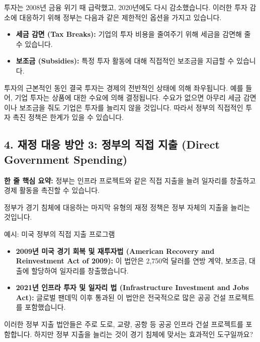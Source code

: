 \documentclass[11pt,a4paper]{article}
\theoremstyle{definition}
\begin{document}
투자는 2008년 금융 위기 때 급락했고, 2020년에도 다시 감소했습니다. 이러한 투자 감소에 대응하기 위해 정부는 다음과 같은 제한적인 옵션을 가지고 있습니다.

\begin{itemize}
    \item \textbf{세금 감면 (Tax Breaks):} 기업의 투자 비용을 줄여주기 위해 세금을 감면해 줄 수 있습니다.
    \item \textbf{보조금 (Subsidies):} 특정 투자 활동에 대해 직접적인 보조금을 지급할 수 있습니다.
\end{itemize}

\begin{cautionbox}{투자의 근본적인 동인}
    결국 투자는 경제의 전반적인 상태에 의해 좌우됩니다. 예를 들어, 기업 투자는 상품에 대한 수요에 의해 결정됩니다. 수요가 없으면 아무리 세금 감면이나 보조금을 줘도 기업은 투자를 늘리지 않을 것입니다. 따라서 정부의 직접적인 투자 촉진 정책은 한계가 있을 수 있습니다.
\end{cautionbox}

\subsection{4. 재정 대응 방안 3: 정부의 직접 지출 (Direct Government Spending)}

\begin{tcolorbox}[mybox={정부 지출의 역할}]
    \textbf{한 줄 핵심 요약:} 정부는 인프라 프로젝트와 같은 직접 지출을 늘려 일자리를 창출하고 경제 활동을 촉진할 수 있습니다.
\end{tcolorbox}

정부가 경기 침체에 대응하는 마지막 유형의 재정 정책은 정부 자체의 지출을 늘리는 것입니다.

\begin{examplebox}{예시: 미국 정부의 직접 지출 프로그램}
    \begin{itemize}
        \item \textbf{2009년 미국 경기 회복 및 재투자법 (American Recovery and Reinvestment Act of 2009):} 이 법안은 2,750억 달러를 연방 계약, 보조금, 대출에 할당하여 일자리를 창출했습니다.
        \item \textbf{2021년 인프라 투자 및 일자리 법 (Infrastructure Investment and Jobs Act):} 글로벌 팬데믹 이후 통과된 이 법안은 전국적으로 많은 공공 건설 프로젝트를 포함했습니다.
    \end{itemize}
\end{examplebox}

이러한 정부 지출 법안들은 주로 도로, 교량, 공항 등 공공 인프라 건설 프로젝트를 포함합니다. 하지만 정부 지출을 늘리는 것이 경기 침체에 맞서는 효과적인 도구일까요?
\end{document}
